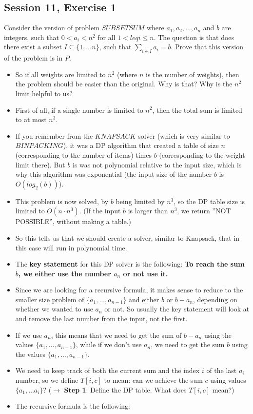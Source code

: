 \subsection {Session 11, Exercise 1}


Consider the version of problem $SUBSETSUM$ where $a_1, a_2, \dots{}, a_n$ and $b$ are integers, such that $0<a_i<n^2$ for all $1<leq{}i\leq{}n$. The question is that does there exist a subset $I\subseteq{}\{1,\dots{}n\}$, such that $\sum\limits_{i\in{}I}a_i = b$. Prove that this version of the problem is in $P$.


\begin{itemize}
    \item So if all weights are limited to $n^2$ (where $n$ is the number of weights), then the problem should be easier than the original. Why is that? Why is the $n^2$ limit helpful to us?
    \item First of all, if a single number is limited to $n^2$, then the total sum is limited to at most $n^3$.
    \item If you remember from the $KNAPSACK$ solver (which is very similar to $BINPACKING$), it was a DP algorithm that created a table of size $n$ (corresponding to the number of items) times $b$ (corresponding to the weight limit there). But $b$ is was not polynomial relative to the input size, which is why this algorithm was exponential (the input size of the number $b$ is $O(log_2(b))$).
    \item This problem is now solved, by $b$ being limited by $n^3$, so the DP table size is limited to $O(n\cdot{}n^3)$. (If the input $b$ is larger than $n^3$, we return ''NOT POSSIBLE'', without making a table.)
    \item So this tells us that we should create a solver, similar to Knapsack, that in this case will run in polynomial time.
    \item The \textbf{key statement} for this DP solver is the following: \textbf{To reach the sum $b$, we either use the number $a_n$ or not use it.}
    \item Since we are looking for a recursive formula, it makes sense to reduce to the smaller size problem of $\{a_1,\dots{}, a_{n-1}\}$ and either $b$ or $b-a_n$, depending on whether we wanted to use $a_n$ or not. So usually the key statement will look at and remove the last number from the input, not the first.
    \item If we use $a_n$, this means that we need to get the sum of $b-a_n$ using the values $\{a_1,\dots{}, a_{n-1}\}$, while if we don't use $a_n$, we need to get the sum $b$ using the values $\{a_1,\dots{},a_{n-1}\}$.
    \item We need to keep track of both the current sum and the index $i$ of the last $a_i$ number, so we define $T[i,c]$ to mean: can we achieve the sum $c$ using values $\{a_1,\dots{}a_i\}$? ($\rightarrow$ \textbf{Step 1}: Define the DP table. What does $T[i,c]$ mean?)
    \item The recursive formula is the following:
\end{itemize}

